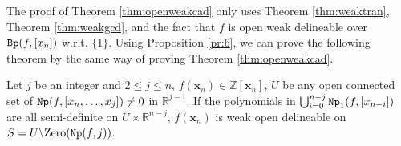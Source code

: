 \documentclass[amsthm]{elsart}
\def \Bproj  {{\tt Bp}}
\def  \zero {{\rm Zero}}
\def  \Nproj {{\tt Np}}
\def \RR {{\mathbb R}}
\def \ZZ {{\mathbb Z}}
\newcommand{\xx}{\bm{x}}
\begin{document}
\begin{comment}
Notice that the proof of Theorem \ref{thm:open delineable} only uses the properties of open delineable (Propositions \ref{prop:sample}-\ref{prop:union}) and Proposition \ref{prop:open}, and Proposition \ref{pr:6} is similar to Proposition \ref{prop:open}. We can prove the following theorem by the same way of proving Theorem \ref{thm:open delineable}.
\end{comment}
The proof of Theorem \ref{thm:openweakcad} only uses Theorem \ref{thm:weaktran}, Theorem \ref{thm:weakgcd}, and the fact that $f$ is open weak delineable over $\Bproj(f,[x_n])$ w.r.t. $\{1\}$. Using Proposition \ref{pr:6}, we can prove the following theorem by the same way of proving Theorem \ref{thm:openweakcad}.
\begin{thm} \label{thm:nprojopen}
        Let $j$ be an integer and $2\le j\le n$, $f(\xx_n)\in \ZZ[\bm{x}_n]$, $U$ be any open connected set of $\Nproj(f,[x_n,\ldots,x_j])\neq0$ in $\RR^{j-1}$. If the polynomials in $\bigcup_{i=0}^{n-j} \Nproj_{1}(f,[x_{n-i}])$ are all semi-definite on $U\times \RR^{n-j}$, $f(\xx_n)$ is weak open delineable on $S=U\backslash\zero(\Nproj(f,j))$.
\end{thm}
\end{document}
